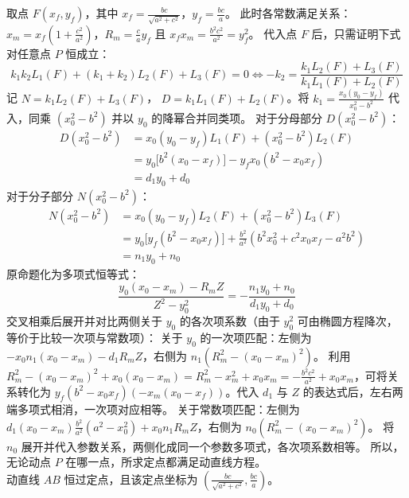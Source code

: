 \begin{solution}
取点 $F(x_f, y_f)$，其中 $x_f = \frac{bc}{\sqrt{a^2+c^2}}$，$y_f = \frac{bc}{a}$。
此时各常数满足关系：$x_m = x_f(1 + \frac{c^2}{a^2})$，$R_m = \frac{c}{a}y_f$ 且 $x_f x_m = \frac{b^2 c^2}{a^2} = y_f^2$。
代入点 $F$ 后，只需证明下式对任意点 $P$ 恒成立：
\[ k_1 k_2 L_1(F) + (k_1 + k_2) L_2(F) + L_3(F) = 0 \iff -k_2 = \frac{k_1 L_2(F) + L_3(F)}{k_1 L_1(F) + L_2(F)} \]
记 $N = k_1 L_2(F) + L_3(F)$， $D = k_1 L_1(F) + L_2(F)$。将 $k_1 = \frac{x_0(y_0 - y_f)}{x_0^2 - b^2}$ 代入，同乘 $(x_0^2 - b^2)$ 并以 $y_0$ 的降幂合并同类项。
对于分母部分 $D(x_0^2 - b^2)$：
\begin{align*}
D(x_0^2 - b^2) &= x_0(y_0 - y_f) L_1(F) + (x_0^2 - b^2) L_2(F) \\
&= y_0 \big[ b^2(x_0 - x_f) \big] - y_f x_0 (b^2 - x_0 x_f) \\
&= d_1 y_0 + d_0
\end{align*}
对于分子部分 $N(x_0^2 - b^2)$：
\begin{align*}
N(x_0^2 - b^2) &= x_0(y_0 - y_f) L_2(F) + (x_0^2 - b^2) L_3(F) \\
&= y_0 \big[ y_f(b^2 - x_0 x_f) \big] + \frac{b^2}{a^2}(b^2 x_0^2 + c^2 x_0 x_f - a^2 b^2) \\
&= n_1 y_0 + n_0
\end{align*}
原命题化为多项式恒等式：
\[ \frac{y_0(x_0 - x_m) - R_m Z}{Z^2 - y_0^2} = -\frac{n_1 y_0 + n_0}{d_1 y_0 + d_0} \]
交叉相乘后展开并对比两侧关于 $y_0$ 的各次项系数（由于 $y_0^2$ 可由椭圆方程降次，等价于比较一次项与常数项）：
关于 $y_0$ 的一次项匹配：左侧为 $-x_0 n_1(x_0 - x_m) - d_1 R_m Z$，右侧为 $n_1(R_m^2 - (x_0 - x_m)^2)$。
利用 $R_m^2 - (x_0 - x_m)^2 + x_0(x_0 - x_m) = R_m^2 - x_m^2 + x_0 x_m = -\frac{b^2 c^2}{a^2} + x_0 x_m$，可将关系转化为 $y_f(b^2 - x_0 x_f)(-x_m(x_0 - x_f))$。代入 $d_1$ 与 $Z$ 的表达式后，左右两端多项式相消，一次项对应相等。
关于常数项匹配：左侧为 $d_1(x_0 - x_m)\frac{b^2}{a^2}(a^2 - x_0^2) + x_0 n_1 R_m Z$，右侧为 $n_0(R_m^2 - (x_0 - x_m)^2)$。
将 $n_0$ 展开并代入参数关系，两侧化成同一个参数多项式，各次项系数相等。
所以，无论动点 $P$ 在哪一点，所求定点都满足动直线方程。\\
动直线 $AB$ 恒过定点，且该定点坐标为 $\left( \frac{bc}{\sqrt{a^2+c^2}}, \frac{bc}{a} \right)$。
\end{solution}

